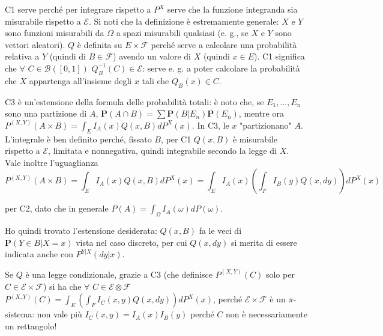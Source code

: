 \documentclass{article}
\begin{document}
C1 serve perch\'{e} per integrare rispetto a $P^{X}$ serve che la funzione
integranda sia misurabile rispetto a $\mathcal{E}$. Si noti che la
definizione \`{e} estremamente generale: $X$ e $Y$ sono funzioni misurabili
da $\Omega $ a spazi misurabili qualsiasi (e. g., se $X$ e $Y$ sono vettori
aleatori). $Q$ \`{e} definita su $E\times \mathcal{F}$ perch\'{e} serve a
calcolare una probabilit\`{a} relativa a $Y$ (quindi di $B\in \mathcal{F}$)
avendo un valore di $X$ (quindi $x\in E$). C1 significa che $\forall $ $C\in 
\mathcal{B}\left( \left[ 0,1\right] \right) $ $Q_{B}^{-1}\left( C\right) \in 
\mathcal{E}$: serve e. g. a poter calcolare la probabilit\`{a} che $X$
appartenga all'insieme degli $x$ tali che $Q_{B}\left( x\right) \in C$.

C3 \`{e} un'estensione della formula delle probabilit\`{a} totali: \`{e}
noto che, se $E_{1},...,E_{n}$ sono una partizione di $A$, $\mathbf{P}\left(
A\cap B\right) =\sum \mathbf{P}\left( B|E_{n}\right) \mathbf{P}\left(
E_{n}\right) $, mentre ora $P^{\left( X,Y\right) }\left( A\times B\right)
=\int_{E}I_{A}\left( x\right) Q\left( x,B\right) dP^{X}\left( x\right) $. In
C3, le $x$ "partizionano" $A$. L'integrale \`{e} ben definito perch\'{e},
fissato $B$, per C1 $Q\left( x,B\right) $ \`{e} misurabile rispetto a $%
\mathcal{E}$, limitata e nonnegativa, quindi integrabile secondo la legge di 
$X$. Vale inoltre l'uguaglianza%
\begin{equation*}
P^{\left( X,Y\right) }\left( A\times B\right) =\int_{E}I_{A}\left( x\right)
Q\left( x,B\right) dP^{X}\left( x\right) =\int_{E}I_{A}\left( x\right)
\left( \int_{F}I_{B}\left( y\right) Q\left( x,dy\right) \right) dP^{X}\left(
x\right)
\end{equation*}

per C2, dato che in generale $P\left( A\right) =\int_{\Omega }I_{A}\left(
\omega \right) dP\left( \omega \right) $.

Ho quindi trovato l'estensione desiderata: $Q\left( x,B\right) $ fa le veci
di $\mathbf{P}\left( Y\in B|X=x\right) $ vista nel caso discreto, per cui $%
Q\left( x,dy\right) $ si merita di essere indicata anche con $P^{Y|X}\left(
dy|x\right) $.

Se $Q$ \`{e} una legge condizionale, grazie a C3 (che definisce $P^{\left(
X,Y\right) }\left( C\right) $ solo per $C\in \mathcal{E\times F}$) si ha che 
$\forall $ $C\in \mathcal{E\otimes F}$ $P^{\left( X,Y\right) }\left(
C\right) =\int_{E}\left( \int_{F}I_{C}\left( x,y\right) Q\left( x,dy\right)
\right) dP^{X}\left( x\right) $, perch\'{e} $\mathcal{E\times F}$ \`{e} un $%
\pi $-sistema: non vale pi\`{u} $I_{C}\left( x,y\right) =I_{A}\left(
x\right) I_{B}\left( y\right) $ perch\'{e} $C$ non \`{e} necessariamente un
rettangolo!
\end{document}
